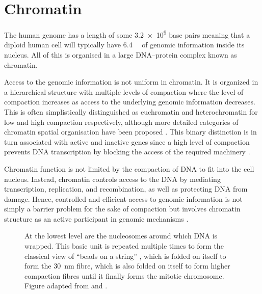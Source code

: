 \section{Chromatin}

  The human genome has a length of some \num{3.2e9}
  base pairs \citep{nature-first-human-genome-draft}
  meaning that a diploid human cell will
  typically have \SI{6.4}{\giga\bp} of genomic information inside
  its nucleus.
  All of this is organised in a large DNA--protein complex known as chromatin.

  Access to the genomic information is not uniform in chromatin.
  It is organized in a hierarchical structure with
  multiple levels of compaction  where
  the level of compaction increases as access to the underlying genomic
  information decreases.
  This is often simplistically distinguished as
  euchromatin and heterochromatin for low and
  high compaction respectively, although more detailed categories of
  chromatin spatial organisation have been proposed
  \citep{brehm2004colours, dixon2016chromatin-domains-review}.
  This binary distinction is in turn associated with active and inactive genes
  since a high level of compaction prevents DNA transcription by blocking
  the access of the required machinery \citep{ball2003portrait}.

  Chromatin function is not limited by the compaction of DNA
  to fit into the cell nucleus.
  Instead, chromatin controls access
  to the DNA by mediating transcription, replication,
  and recombination, as
  well as protecting DNA from damage.  Hence, controlled and efficient
  access to genomic information is not simply a barrier problem for the sake
  of compaction but involves chromatin structure as an active
  participant in genomic mechanisms \citep{controlling-double-helix}.

  \begin{figure}
    \centering
    \def\svgwidth{\textwidth}
                 {At the lowest level are the nucleosomes around which
                  DNA is wrapped.
                  This basic unit is repeated multiple times to form
                  the classical view of ``beads on a string''
                  ,
                  which is folded on itself to form the
                  \SI{30}{\nano\meter} fibre,
                  which is also folded on itself to form higher
                  compaction fibres until it finally forms the
                  mitotic chromosome.
                  Figure adapted from \cite{alberts} and \cite{lodish}.}
    \label{fig:intro:chromatin-structure}
  \end{figure}

